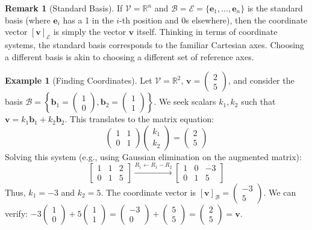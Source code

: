 \documentclass[12pt, letterpaper]{article}
\theoremstyle{definition}
\newtheorem{example}{Example}[section]
\newtheorem{remark}{Remark}[section]
\newcommand{\R}{\mathbb{R}}
\newcommand{\V}{\mathcal{V}}
\newcommand{\B}{\mathcal{B}}
\newcommand{\E}{\mathcal{E}}
\newcommand{\vect}[1]{\mathbf{#1}} %
\renewcommand{\v}{\vect{v}} %
\newcommand{\e}{\vect{e}} %
\newcommand{\bvec}{\vect{b}} %
\begin{document}
\begin{remark}[Standard Basis]
If $\V = \R^n$ and $\B = \E = \{\e_1, \dots, \e_n\}$ is the standard basis (where $\e_i$ has a 1 in the $i$-th position and 0s elsewhere), then the coordinate vector $[\v]_\E$ is simply the vector $\v$ itself. Thinking in terms of coordinate systems, the standard basis corresponds to the familiar Cartesian axes. Choosing a different basis is akin to choosing a different set of reference axes.
\end{remark}

\begin{example}[Finding Coordinates]
Let $\V = \R^2$, $\v = \begin{pmatrix} 2 \\ 5 \end{pmatrix}$, and consider the basis $\B = \left\{ \bvec_1 = \begin{pmatrix} 1 \\ 0 \end{pmatrix}, \bvec_2 = \begin{pmatrix} 1 \\ 1 \end{pmatrix} \right\}$. We seek scalars $k_1, k_2$ such that $\v = k_1 \bvec_1 + k_2 \bvec_2$. This translates to the matrix equation:
\[ \begin{pmatrix} 1 & 1 \\ 0 & 1 \end{pmatrix} \begin{pmatrix} k_1 \\ k_2 \end{pmatrix} = \begin{pmatrix} 2 \\ 5 \end{pmatrix} \]
Solving this system (e.g., using Gaussian elimination on the augmented matrix):
\[ \left[ \begin{array}{cc|c} 1 & 1 & 2 \\ 0 & 1 & 5 \end{array} \right] \xrightarrow{R_1 \leftarrow R_1 - R_2} \left[ \begin{array}{cc|c} 1 & 0 & -3 \\ 0 & 1 & 5 \end{array} \right] \]
Thus, $k_1 = -3$ and $k_2 = 5$. The coordinate vector is $[\v]_\B = \begin{pmatrix} -3 \\ 5 \end{pmatrix}$.
We can verify: $-3 \begin{pmatrix} 1 \\ 0 \end{pmatrix} + 5 \begin{pmatrix} 1 \\ 1 \end{pmatrix} = \begin{pmatrix} -3 \\ 0 \end{pmatrix} + \begin{pmatrix} 5 \\ 5 \end{pmatrix} = \begin{pmatrix} 2 \\ 5 \end{pmatrix} = \v$.

\end{example}
\end{document}
